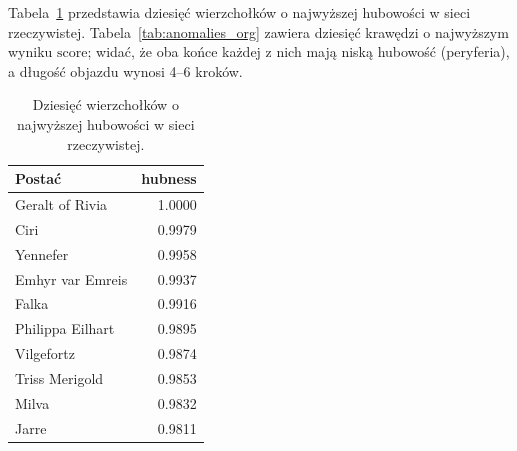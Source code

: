 \documentclass[12pt]{article}
\begin{document}
Tabela~\ref{tab:hubs_org} przedstawia dziesięć wierzchołków o najwyższej hubowości w sieci rzeczywistej. Tabela~\ref{tab:anomalies_org} zawiera dziesięć krawędzi o najwyższym wyniku $\mathrm{score}$; widać, że oba końce każdej z nich mają niską hubowość (peryferia), a długość objazdu wynosi 4--6 kroków.

\begin{table}[H]
    \centering
    \begin{tabular}{lr}
        \toprule
        Postać & hubness \\
        \midrule
        Geralt of Rivia   & 1.0000 \\
        Ciri              & 0.9979 \\
        Yennefer          & 0.9958 \\
        Emhyr var Emreis  & 0.9937 \\
        Falka             & 0.9916 \\
        Philippa Eilhart  & 0.9895 \\
        Vilgefortz        & 0.9874 \\
        Triss Merigold    & 0.9853 \\
        Milva             & 0.9832 \\
        Jarre             & 0.9811 \\
        \bottomrule
    \end{tabular}
    \caption{Dziesięć wierzchołków o najwyższej hubowości w sieci rzeczywistej.}
    \label{tab:hubs_org}
\end{table}
\end{document}
